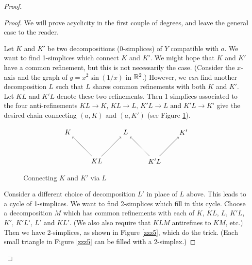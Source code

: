 \begin{proof}
\begin{proof}
We will prove acyclicity in the first couple of degrees, and 
leave the general case to the reader.

Let $K$ and $K'$ be two decompositions (0-simplices) of $Y$ compatible with $a$.
We want to find 1-simplices which connect $K$ and $K'$.
We might hope that $K$ and $K'$ have a common refinement, but this is not necessarily
the case.
(Consider the $x$-axis and the graph of $y = x^2\sin(1/x)$ in $\mathbb{R}^2$.)
However, we {\it can} find another decomposition $L$ such that $L$ shares common
refinements with both $K$ and $K'$.
Let $KL$ and $K'L$ denote these two refinements.
Then 1-simplices associated to the four anti-refinements
$KL\to K$, $KL\to L$, $K'L\to L$ and $K'L\to K'$
give the desired chain connecting $(a, K)$ and $(a, K')$
(see Figure \ref{zzz4}).

\begin{figure}[!ht]
\begin{equation*}
\begin{tikzpicture}
\foreach \x/\label in {-3/K, 0/L, 3/K'} {
	\node(\label) at (\x,0) {$\label$};
}
\foreach \x/\la/\lb in {-1.5/K/L, 1.5/K'/L} {
	\node(\la \lb) at (\x,-1.5) {$\la \lb$};
	\draw[->] (\la \lb) -- (\la);
	\draw[->] (\la \lb) -- (\lb); 
}
\end{tikzpicture}
\end{equation*}
\caption{Connecting $K$ and $K'$ via $L$}
\label{zzz4}
\end{figure}

Consider a different choice of decomposition $L'$ in place of $L$ above.
This leads to a cycle of 1-simplices.
We want to find 2-simplices which fill in this cycle.
Choose a decomposition $M$ which has common refinements with each of 
$K$, $KL$, $L$, $K'L$, $K'$, $K'L'$, $L'$ and $KL'$.
(We also also require that $KLM$ antirefines to $KM$, etc.)
Then we have 2-simplices, as shown in Figure \ref{zzz5}, which do the trick.
(Each small triangle in Figure \ref{zzz5} can be filled with a 2-simplex.)


\end{proof}
\end{proof}
